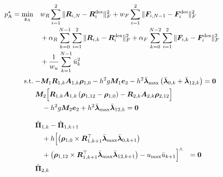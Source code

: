 \begin{subequations}
\label{eq:controlled_acrobot_pop}
\begin{align}
p_{\mathrm A}^{\star}
=
\min_{\bm{z}_{\mathrm{A}}}
\quad
&w_R\sum_{i=1}^{2}\|\bm{R}_{i,N}-\bm{R}_i^{\mathrm{des}}\|_F^2
+w_F\sum_{i=1}^{2}\|\bm{F}_{i,N-1}-\bm{F}_i^{\mathrm{des}}\|_F^2
\notag\\[-0.1em]
&+\alpha_R\sum_{k=0}^{N-1}\sum_{i=1}^{2}
  \|\bm{R}_{i,k}-\bm{R}_i^{\mathrm{des}}\|_F^2
+\alpha_F\sum_{k=0}^{N-2}\sum_{i=1}^{2}
  \|\bm{F}_{i,k}-\bm{F}_i^{\mathrm{des}}\|_F^2
\notag\\[-0.1em]
&+\frac{1}{w_u}\sum_{k=1}^{N-1}\bar u_k^2
\label{eq:controlled_acrobot_pop_objective}
\\[0.2em]
\hspace{-0.9em}\text{s.t.}\quad
&\hspace{-0.9em}\begin{aligned}
-\bm{M}_1 \bm{R}_{1,k}
\bm{A}_{1,k}\bm{\rho}_{1,0}
-h^2g\bm{M}_1\bm{e}_2
-h^2\bar{\bm{\lambda}}_{\max}\left(\bar{\bm{\lambda}}_{0,k}+\bar{\bm{\lambda}}_{12,k}\right)
&=\bm{0}
\end{aligned}
\label{eq:controlled_acrobot_pop_translation_1}\\
&\hspace{-0.9em}\begin{aligned}
&\bm{M}_2\Bigl[
\bm{R}_{1,k}
\bm{A}_{1,k}
\left(\bm{\rho}_{1,12}-\bm{\rho}_{1,0}\right)
-\bm{R}_{2,k}
\bm{A}_{2,k}\bm{\rho}_{2,12}
\Bigr] \\
&\quad
-h^2g\bm{M}_2\bm{e}_2
+h^2\bar{\bm{\lambda}}_{\max}\bar{\bm{\lambda}}_{12,k}
=\bm{0}
\end{aligned}
\label{eq:controlled_acrobot_pop_translation_2}\\[0.8em]
&\hspace{-0.9em}\begin{aligned}
&
\hat{\bm{\Pi}}_{1,k}
-\hat{\bm{\Pi}}_{1,k+1}
\\
&\quad
+h
\Bigl[
\left(
\bm{\rho}_{1,0}
\times
\bm{R}_{1,k+1}^{\top} \bar{\bm{\lambda}}_{\max} \bar{\bm{\lambda}}_{0,k+1}
\right)\\
&\quad
+
\left(
\bm{\rho}_{1,12}
\times
\bm{R}_{1,k+1}^{\top}\bar{\bm{\lambda}}_{\max}\bar{\bm{\lambda}}_{12,k+1}
\right)
-u_{\max}\bar u_{k+1}
\Bigr]^{\wedge}
&=\bm{0}
\end{aligned}
\label{eq:controlled_acrobot_pop_rotation_1}
\\
&\hspace{-0.9em}\begin{aligned}
\hat{\bm{\Pi}}_{2,k}

\end{aligned}
\end{align}
\end{subequations}

